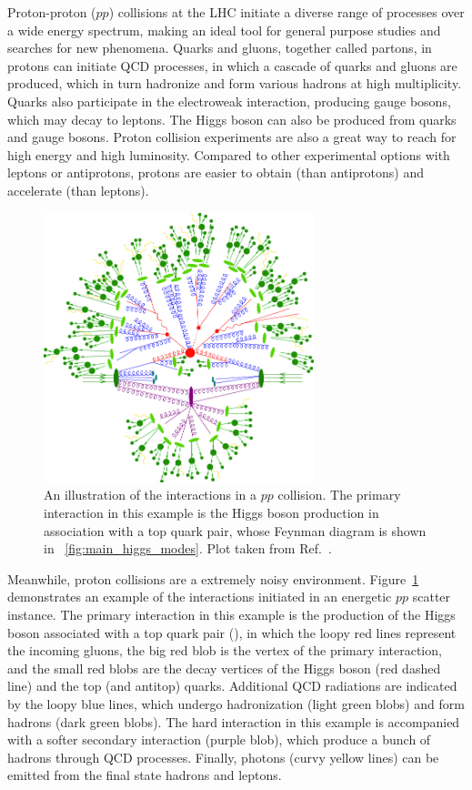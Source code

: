 Proton-proton ($pp$) collisions at the LHC initiate a diverse range of processes over a wide energy spectrum,
making an ideal tool for general purpose studies and searches for new phenomena.
Quarks and gluons, together called partons, in protons can initiate QCD processes, 
in which a cascade of quarks and gluons are produced, which in turn hadronize and form various hadrons at high multiplicity.
Quarks also participate in the electroweak interaction, producing gauge bosons, which may decay to leptons.
The Higgs boson can also be produced from quarks and gauge bosons.
Proton collision experiments are also a great way to reach for high energy and high luminosity.
Compared to other experimental options with leptons or antiprotons, 
protons are easier to obtain (than antiprotons) and accelerate (than leptons).

\begin{figure}[!htb]
    \centering
    \captionsetup{justification=justified}
    \includegraphics[width=0.70\textwidth]{pics/LHC_CMS/sherpa_sim.png}
    \caption{An illustration of the interactions in a $pp$ collision.
             The primary interaction in this example is the Higgs boson production in association with a top quark pair, 
             whose Feynman diagram is shown in ~\ref{fig:main_higgs_modes}.
             Plot taken from Ref.~\cite{Gleisberg_2009}.}
    \label{fig:sherpa_pp}
\end{figure}

Meanwhile, proton collisions are a extremely noisy environment.
Figure~\ref{fig:sherpa_pp} demonstrates an example of the interactions initiated in an energetic $pp$ scatter instance.
The primary interaction in this example is the production of the Higgs boson associated with a top quark pair (\ttH),
in which the loopy red lines represent the incoming gluons, the big red blob is the vertex of the primary interaction,
and the small red blobs are the decay vertices of the Higgs boson (red dashed line) and the top (and antitop) quarks.
Additional QCD radiations are indicated by the loopy blue lines, which undergo hadronization (light green blobs) and form hadrons (dark green blobs). 
The hard interaction in this example is accompanied with a softer secondary interaction (purple blob), 
which produce a bunch of hadrons through QCD processes.
Finally, photons (curvy yellow lines) can be emitted from the final state hadrons and leptons.

